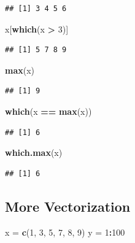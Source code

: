 \documentclass[]{book}
\newenvironment{Shaded}{\begin{snugshade}}{\end{snugshade}}
\newcommand{\KeywordTok}[1]{\textcolor[rgb]{0.13,0.29,0.53}{\textbf{#1}}}
\newcommand{\DecValTok}[1]{\textcolor[rgb]{0.00,0.00,0.81}{#1}}
\newcommand{\StringTok}[1]{\textcolor[rgb]{0.31,0.60,0.02}{#1}}
\newcommand{\OperatorTok}[1]{\textcolor[rgb]{0.81,0.36,0.00}{\textbf{#1}}}
\newcommand{\NormalTok}[1]{#1}
\theoremstyle{definition}
\theoremstyle{definition}
\theoremstyle{definition}
\theoremstyle{remark}
\begin{document}
\begin{verbatim}
## [1] 3 4 5 6
\end{verbatim}

\begin{Shaded}
\begin{Highlighting}[]
\NormalTok{x[}\KeywordTok{which}\NormalTok{(x }\OperatorTok{>}\StringTok{ }\DecValTok{3}\NormalTok{)]}
\end{Highlighting}
\end{Shaded}

\begin{verbatim}
## [1] 5 7 8 9
\end{verbatim}

\begin{Shaded}
\begin{Highlighting}[]
\KeywordTok{max}\NormalTok{(x)}
\end{Highlighting}
\end{Shaded}

\begin{verbatim}
## [1] 9
\end{verbatim}

\begin{Shaded}
\begin{Highlighting}[]
\KeywordTok{which}\NormalTok{(x }\OperatorTok{==}\StringTok{ }\KeywordTok{max}\NormalTok{(x))}
\end{Highlighting}
\end{Shaded}

\begin{verbatim}
## [1] 6
\end{verbatim}

\begin{Shaded}
\begin{Highlighting}[]
\KeywordTok{which.max}\NormalTok{(x)}
\end{Highlighting}
\end{Shaded}

\begin{verbatim}
## [1] 6
\end{verbatim}

\subsection{More Vectorization}\label{more-vectorization}

\begin{Shaded}
\begin{Highlighting}[]
\NormalTok{x =}\StringTok{ }\KeywordTok{c}\NormalTok{(}\DecValTok{1}\NormalTok{, }\DecValTok{3}\NormalTok{, }\DecValTok{5}\NormalTok{, }\DecValTok{7}\NormalTok{, }\DecValTok{8}\NormalTok{, }\DecValTok{9}\NormalTok{)}
\NormalTok{y =}\StringTok{ }\DecValTok{1}\OperatorTok{:}\DecValTok{100}
\end{Highlighting}
\end{Shaded}
\end{document}
